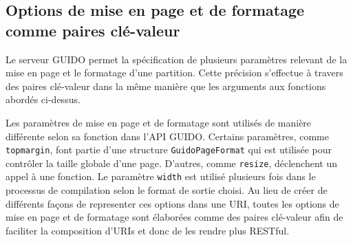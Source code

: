 \documentclass{article}
\newcommand{\guidosize}{7pt}
\begin{document}
\subsection{Options de mise en page et de formatage comme paires clé-valeur}
Le serveur GUIDO permet la spécification de plusieurs paramètres relevant de la mise en page et le formatage d'une partition. Cette précision s'effectue à travers des paires clé-valeur dans la même manière que les arguments aux fonctions abordés ci-dessus.\par
Les paramètres de mise en page et de formatage sont utilisés de manière différente selon sa fonction dans l'API GUIDO. Certains paramètres, comme \break \verb=topmargin=, font partie d'une structure \break \verb=GuidoPageFormat= qui est utilisée pour contrôler la taille globale d'une page. D'autres, comme \verb=resize=, déclenchent un appel à une fonction. Le paramètre \verb=width= est utilisé plusieurs fois dans le processus de compilation selon le format de sortie choisi. Au lieu de créer de différents façons de representer ces options dans une URI, toutes les options de mise en page et de formatage sont élaborées comme des paires clé-valeur afin de faciliter la composition d'URIs et donc de les rendre plus RESTful. 

\end{document}
